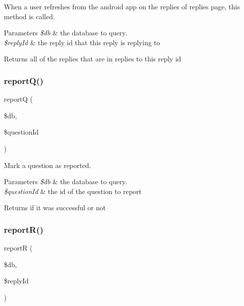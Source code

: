 When a user refreshes from the android app on the replies of replies page, this method is called. 


\begin{DoxyParams}{Parameters}
{\em \$db} & the database to query. \\
\hline
{\em \$reply\+Id} & the reply id that this reply is replying to \\
\hline
\end{DoxyParams}
\begin{DoxyReturn}{Returns}
all of the replies that are in replies to this reply id 
\end{DoxyReturn}
\mbox{\label{androidApi_8php_ac56862a233d867f66572c317e72866b7}} 
\subsubsection{\texorpdfstring{report\+Q()}{reportQ()}}
{\footnotesize\ttfamily reportQ (\begin{DoxyParamCaption}\item[{}]{\$db,  }\item[{}]{\$question\+Id }\end{DoxyParamCaption})}



Mark a question as reported. 


\begin{DoxyParams}{Parameters}
{\em \$db} & the database to query. \\
\hline
{\em \$question\+Id} & the id of the question to report \\
\hline
\end{DoxyParams}
\begin{DoxyReturn}{Returns}
if it was successful or not 
\end{DoxyReturn}
\mbox{\label{androidApi_8php_aed1a7d6c08dece8c10b1c3c726e7c50b}} 
\subsubsection{\texorpdfstring{report\+R()}{reportR()}}
{\footnotesize\ttfamily reportR (\begin{DoxyParamCaption}\item[{}]{\$db,  }\item[{}]{\$reply\+Id }\end{DoxyParamCaption})}



